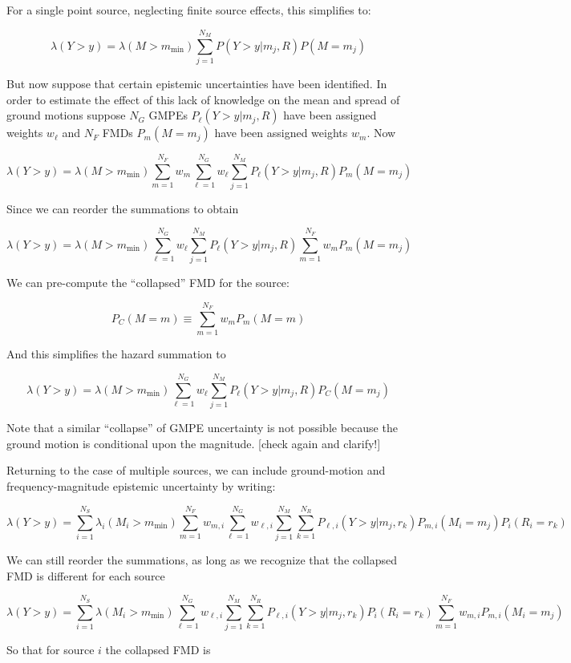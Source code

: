 \documentclass{article}
\begin{document}
For a single point source, neglecting finite source effects, this simplifies to:

$$ \lambda(Y > y) = 
\lambda(M > m_\text{min}) 
\sum_{j=1}^{N_M} 
P(Y > y|m_j,R) 
P(M=m_j) $$

But now suppose that certain epistemic uncertainties have been identified. 
In order to estimate the effect of this lack of knowledge on the mean and spread of ground motions suppose $N_G$ GMPEs $P_\ell(Y > y|m_j,R)$ have been assigned weights $w_\ell$ and $N_F$ FMDs $P_m(M=m_j)$ have been assigned weights $w_m$. 
Now

$$ \lambda(Y > y) = 
\lambda(M > m_\text{min}) 
\sum_{m=1}^{N_F} w_m 
\sum_{\ell=1}^{N_G} w_\ell 
\sum_{j=1}^{N_M} 
P_\ell(Y > y|m_j,R) 
P_m(M=m_j) $$

Since we can reorder the summations to obtain

$$ \lambda(Y > y) = 
\lambda(M > m_\text{min}) 
\sum_{\ell=1}^{N_G} w_\ell 
\sum_{j=1}^{N_M} 
P_\ell(Y > y|m_j,R) 
\sum_{m=1}^{N_F} w_m 
P_m(M=m_j) $$

We can pre-compute the ``collapsed'' FMD for the source:

$$ P_C(M=m) \equiv \sum_{m=1}^{N_F} w_m P_m(M=m) $$

And this simplifies the hazard summation to

$$ \lambda(Y > y) = 
\lambda(M > m_\text{min}) 
\sum_{\ell=1}^{N_G} w_\ell 
\sum_{j=1}^{N_M} 
P_\ell(Y > y|m_j,R) 
P_C(M=m_j) $$

Note that a similar ``collapse'' of GMPE uncertainty is not possible because the ground motion is conditional upon the magnitude. [check again and clarify!]

Returning to the case of multiple sources, we can include ground-motion and frequency-magnitude epistemic uncertainty by writing:

$$ \lambda(Y > y) = 
\sum_{i=1}^{N_S} 
\lambda_i(M_i > m_\text{min}) 
\sum_{m=1}^{N_F} w_{m,i} 
\sum_{\ell=1}^{N_G} w_{\ell,i}
\sum_{j=1}^{N_M} 
\sum_{k=1}^{N_R} 
P_{\ell,i}(Y > y|m_j,r_k) 
P_{m,i}(M_i=m_j) 
P_i(R_i=r_k) $$

We can still reorder the summations, as long as we recognize that the collapsed FMD is different for each source

$$
\lambda(Y > y) = 
\sum_{i=1}^{N_S} 
\lambda(M_i > m_\text{min}) 
\sum_{\ell=1}^{N_G} w_{\ell,i}
\sum_{j=1}^{N_M} 
\sum_{k=1}^{N_R} 
P_{\ell,i}(Y > y|m_j,r_k) 
P_i(R_i=r_k) 
\sum_{m=1}^{N_F} w_{m,i} 
P_{m,i}(M_i=m_j) 
$$

So that for source $i$ the collapsed FMD is
\end{document}
